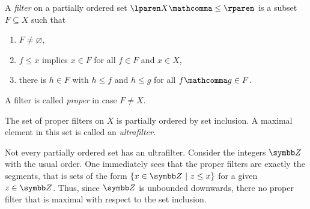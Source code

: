 \begin{definition}
  A \emph{filter} on a partially ordered set
  $\lparen X \mathcomma \leq \rparen$
  is a subset
  $F \subseteq X$
  such that
  \begin{enumerate}
    \item $F \ne \varnothing$,
    \item $f \leq x$ implies $x \in F$
    for all $f \in F$ and $x \in X$,
    \item there is $h \in F$ with $h \leq f$ and $h \leq g$
    for all $f \mathcomma g \in F$.
  \end{enumerate}
  A filter is called \emph{proper} in case $F \ne X$.
\end{definition}

\begin{definition}
  The set of proper filters on $X$ is partially ordered by set inclusion.
  A maximal element in this set is called an \emph{ultrafilter}.
\end{definition}

\begin{remark}
  Not every partially ordered set has an ultrafilter.
  Consider the integers $\Z$ with the usual order.
  One immediately sees that the proper filters are exactly the segments,
  that is sets of the form
  $\lbrace x \in \Z \pipe z \leq x \rbrace$
  for a given $z \in \Z$.
  Thus,
  since $\Z$ is unbounded downwards,
  there no proper filter that is maximal with respect to the set inclusion.
\end{remark}
